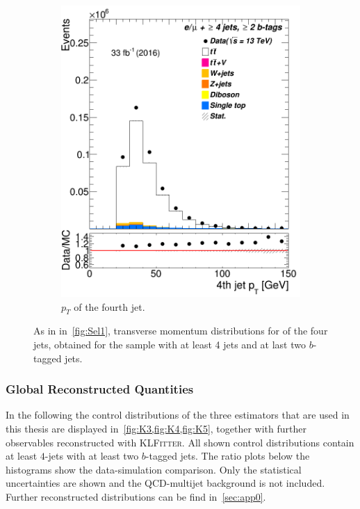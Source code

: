 \begin{figure} [t]
\begin{subfigure}{0.25\textwidth}
		\includegraphics[width=\linewidth]{ControlPlots_emujets_2016_4incl_2incl/jet3_pt_emujets_2016.png}
		\caption{$p_T$ of the fourth jet.} \label{fig:Sec28}
	\end{subfigure}
	
	
	\caption{As in in~\cref{fig:Sel1}, transverse momentum distributions  for of the four jets, obtained for the sample with at least 4 jets and at last two $b$-tagged jets.}
	\label{fig:Sel4}
\end{figure}



\subsubsection{Global Reconstructed Quantities}


In the following the control distributions of the three estimators that are used in this thesis are displayed in~\cref{fig:K3,fig:K4,fig:K5}, together with further observables  reconstructed with \textsc{KLFitter}. 
All shown control distributions contain at least $4$-jets with at least two $b$-tagged jets.  The ratio plots below the histograms show the data-simulation comparison. Only the statistical uncertainties are shown and the QCD-multijet background is not included. Further reconstructed distributions can be find in~\cref{sec:app0}. 



